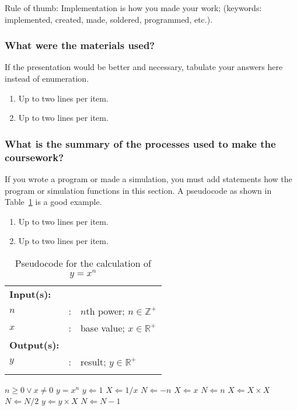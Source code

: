 Rule of thumb: Implementation is how you made your  work; (keywords: implemented, created, made, soldered, programmed, etc.).


\subsubsection{What were the materials used?}
If the presentation would be better and necessary, tabulate your answers here instead of enumeration.
\begin{enumerate}
	\item Up to two lines per item.
	\item Up to two lines per item.
\end{enumerate}


\subsubsection{What is the summary of the processes used to make the coursework?}
If you wrote a program or made a simulation, you must add statements how the program or simulation functions in this section.	A pseudocode as shown in Table~\ref{tab:calcxn} is a good example.
\begin{enumerate}
	\item Up to two lines per item.
	\item Up to two lines per item.
\end{enumerate}

\begin{table}[!b]
	\caption{Pseudocode for the calculation of $y = x^n$}
	\label{tab:calcxn}	
	\centering
	{\footnotesize
		\begin{tabular}{lll}
			\hline
			\hline
			{\bfseries Input(s):} & & \\
			$n$ & : & $n$th power; $n \in \mathbb{Z}^{+}$ \\
			$x$ & : & base value; $x \in \mathbb{R}^{+}$ \\
			\hline
			{\bfseries Output(s):} & & \\
			$y$ & : & result; $y \in \mathbb{R}^{+}$  \\
			\hline
			\hline
			\\
		\end{tabular}
	}
	\begin{algorithmic}[1]
		{\footnotesize
			\REQUIRE $n \geq 0 \vee x \neq 0$
			\ENSURE $y = x^n$
			\STATE $y \Leftarrow 1$
			\STATE $X \Leftarrow 1 / x$
			\STATE $N \Leftarrow -n$
			\ELSE
			\STATE $X \Leftarrow x$
			\STATE $N \Leftarrow n$
			\ENDIF
			\STATE $X \Leftarrow X \times X$
			\STATE $N \Leftarrow N / 2$
			\ELSE[$N$ is odd]
			\STATE $y \Leftarrow y \times X$
			\STATE $N \Leftarrow N - 1$
			\ENDIF
			\ENDWHILE
		}
	\end{algorithmic}
\end{table}







